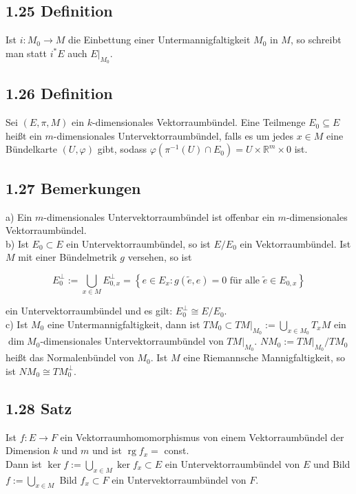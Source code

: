 \documentclass[10pt, letterpaper]{article}
\begin{document}
\subsection*{1.25 Definition}
Ist $i: M_{0} \rightarrow M$ die Einbettung einer Untermannigfaltigkeit $M_{0}$ in $M$, so schreibt man statt $i^{*} E$ auch $\left.E\right|_{M_{0}}$.

\subsection*{1.26 Definition}
Sei $(E, \pi, M)$ ein $k$-dimensionales Vektorraumbündel. Eine Teilmenge $E_{0} \subseteq E$ heißt ein $m$-dimensionales Untervektorraumbündel, falls es um jedes $x \in M$ eine Bündelkarte $(U, \varphi)$ gibt, sodass $\varphi\left(\pi^{-1}(U) \cap E_{0}\right)=U \times \mathbb{R}^{m} \times 0$ ist.

\subsection*{1.27 Bemerkungen}
a) Ein $m$-dimensionales Untervektorraumbündel ist offenbar ein $m$-dimensionales Vektorraumbündel.\\
b) Ist $E_{0} \subset E$ ein Untervektorraumbündel, so ist $E / E_{0}$ ein Vektorraumbündel. Ist $M$ mit einer Bündelmetrik $g$ versehen, so ist

$$
E_{0}^{\perp}:=\bigcup_{x \in M} E_{0, x}^{\perp}=\left\{e \in E_{x}: g(\tilde{e}, e)=0 \text { für alle } \tilde{e} \in E_{0, x}\right\}
$$

ein Untervektorraumbündel und es gilt: $E_{0}^{\perp} \cong E / E_{0}$.\\
c) Ist $M_{0}$ eine Untermannigfaltigkeit, dann ist $\left.T M_{0} \subset T M\right|_{M_{0}}:=\bigcup_{x \in M_{0}} T_{x} M$ ein $\operatorname{dim} M_{0}$-dimensionales Untervektorraumbündel von $\left.T M\right|_{M_{0}}$. $N M_{0}:=\left.T M\right|_{M_{0}} / T M_{0}$ heißt das Normalenbündel von $M_{0}$. Ist $M$ eine Riemannsche Mannigfaltigkeit, so ist $N M_{0} \cong T M_{0}^{\perp}$.

\subsection*{1.28 Satz}
Ist $f: E \rightarrow F$ ein Vektorraumhomomorphismus von einem Vektorraumbündel der Dimension $k$ und $m$ und ist $\operatorname{rg} f_{x}=$ const.\\
Dann ist $\operatorname{ker} f:=\bigcup_{x \in M} \operatorname{ker} f_{x} \subset E$ ein Untervektorraumbündel von $E$ und Bild $f:=\bigcup_{x \in M}$ Bild $f_{x} \subset F$ ein Untervektorraumbündel von $F$.
\end{document}
